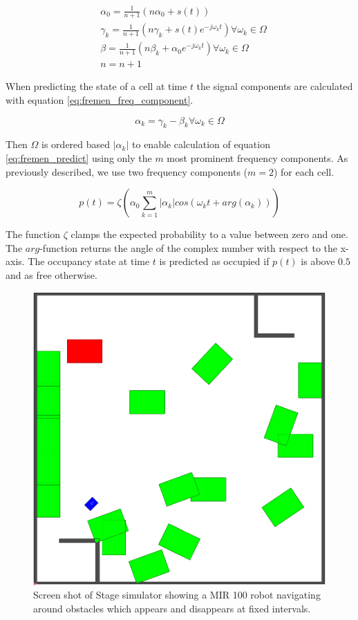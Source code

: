 \begin{eqnarray}
&\alpha_0 = \frac{1}{n+1}(n \alpha_0 + s(t)) \nonumber \\ 
&\gamma_k = \frac{1}{n+1}(n \gamma_k + s(t) e^{-j \omega_k t}) \forall \omega_k \in \Omega  \\
&\beta = \frac{1}{n+1}(n \beta_k + \alpha_0 e^{-j \omega_k t}) \forall \omega_k \in \Omega \nonumber \\
&n = n + 1 \nonumber
\label{eq:fremen_update}
\end{eqnarray}

When predicting the state of a cell at time $t$ the signal components are calculated with equation \ref{eq:fremen_freq_component}.

\begin{equation}
    \alpha_k = \gamma_k - \beta_k \forall \omega_k \in \Omega
    \label{eq:fremen_freq_component}
\end{equation}

Then $ \Omega $ is ordered based $ | \alpha_k | $ to enable calculation of equation \ref{eq:fremen_predict} using only the $m$ most prominent frequency components. As previously described, we use two frequency components ($ m=2 $) for each cell.

\begin{equation}
p(t) = \zeta \left( \alpha_0 \sum_{k=1}^{m} |\alpha_k| cos(\omega_k t + arg(\alpha_k))  \right)
\label{eq:fremen_predict}
\end{equation}

The function $\zeta$ clamps the expected probability to a value between zero and one. The $arg$-function returns the angle of the complex number with respect to the x-axis.
The occupancy state at time $t$ is predicted as occupied if $p(t)$ is above $0.5$ and as free otherwise.

\begin{figure}[htbp]
\centering
\includegraphics[width=0.4\linewidth]{chapters/mapping_of_dynamic_areas/figures/simulated_environment}
\caption{Screen shot of Stage simulator showing a MIR 100 robot navigating around obstacles which appears and disappears at fixed intervals.}
\label{fig:simulated_environment}
\end{figure}

